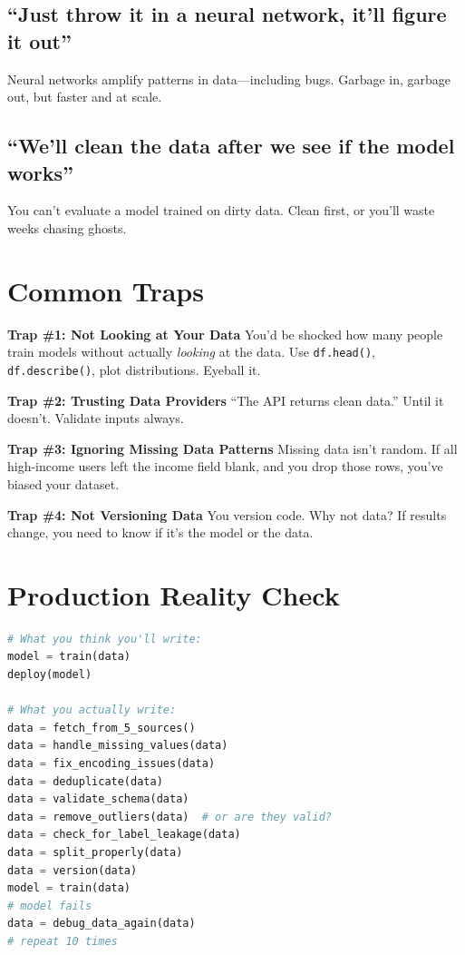 \documentclass[11pt,oneside]{book}
\begin{document}
\subsection{``Just throw it in a neural network, it'll figure it out''}
Neural networks amplify patterns in data—including bugs. Garbage in, garbage out, but faster and at scale.

\subsection{``We'll clean the data after we see if the model works''}
You can't evaluate a model trained on dirty data. Clean first, or you'll waste weeks chasing ghosts.

\section{Common Traps}

\textbf{Trap \#1: Not Looking at Your Data}
You'd be shocked how many people train models without actually \textit{looking} at the data. Use \texttt{df.head()}, \texttt{df.describe()}, plot distributions. Eyeball it.

\textbf{Trap \#2: Trusting Data Providers}
``The API returns clean data.'' Until it doesn't. Validate inputs always.

\textbf{Trap \#3: Ignoring Missing Data Patterns}
Missing data isn't random. If all high-income users left the income field blank, and you drop those rows, you've biased your dataset.

\textbf{Trap \#4: Not Versioning Data}
You version code. Why not data? If results change, you need to know if it's the model or the data.

\section{Production Reality Check}

\begin{lstlisting}[language=Python]
# What you think you'll write:
model = train(data)
deploy(model)

# What you actually write:
data = fetch_from_5_sources()
data = handle_missing_values(data)
data = fix_encoding_issues(data)
data = deduplicate(data)
data = validate_schema(data)
data = remove_outliers(data)  # or are they valid?
data = check_for_label_leakage(data)
data = split_properly(data)
data = version(data)
model = train(data)
# model fails
data = debug_data_again(data)
# repeat 10 times
\end{lstlisting}
\end{document}
